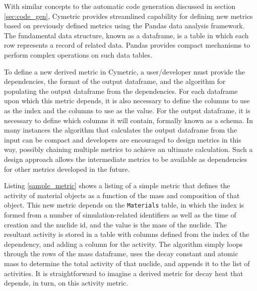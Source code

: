 With similar concepts to the automatic code generation discussed in section
\ref{sec:code_gen}, Cymetric provides streamlined capability for defining new
metrics based on previously defined metrics using the Pandas data analysis
framework.  The fundamental data structure, known as a
dataframe, is a table in which each row represents a record of related data.
Pandas provides compact mechanisms to perform complex operations on such data
tables.

To define a new derived metric in Cymetric, a user/developer must provide the
dependencies, the format of the output dataframe, and the algorithm for
populating the output dataframe from the dependencies.  For each dataframe
upon which this metric depends, it is also necessary to define the columns to
use as the index and the columns to use as the value.  For the output
dataframe, it is necessary to define which columns it will contain, formally
known as a schema.  In many instances the algorithm that calculates the output
dataframe from the input can be compact and developers are encouraged to
design metrics in this way, possibly chaining multiple metrics to achieve an
ultimate calculation.  Such a design approach allows the intermediate metrics
to be available as dependencies for other metrics developed in the future.

Listing \ref{sample_metric} shows a listing of a simple metric that defines
the activity of material objects as a function of the mass and composition of
that object.  This new metric depends on the \texttt{Materials} table, in
which the index is formed from a number of simulation-related identifiers as
well as the time of creation and the nuclide id, and the value is the mass of
the nuclide.  The resultant activity is stored in a table with columns defined
from the index of the dependency, and adding a column for the activity.  The
algorithm simply loops through the rows of the mass dataframe, uses the decay
constant and atomic mass to determine the total activity of that nuclide, and
appends it to the list of activities.  It is straightforward to imagine a
derived metric for decay heat that depends, in turn, on this activity metric.


